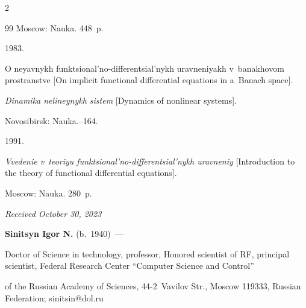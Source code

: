 \begin{multicols}{2}
{{\begin{thebibliography}{99}
Moscow: Nauka. 448~p.





 1983.

O neyavnykh funktsional'no-differentsial'nykh uravneniyakh v~banakhovom pro\-stran\-st\-ve [On implicit functional differential equations in a~Banach space].

\textit{Dinamika nelineynykh sistem} [Dynamics of nonlinear systems]. 

Novosibirsk: Nauka.--164.





 1991.

\textit{Vvedenie v~teoriyu funktsional'no-differentsial'nykh uravneniy} [Introduction to the theory of functional differential equations]. 

Moscow: Nauka. 280~p.

 





\end{thebibliography}



 }

 }



\end{multicols}



\vspace*{-6pt}



\hfill{\small\textit{Received October 30, 2023}} 



\vspace*{-18pt}



\Contrl



\vspace*{-3pt}



\noindent 

\textbf{Sinitsyn Igor N.} (b.\ 1940)~--- 

Doctor of Science in technology, professor, Honored scientist of RF, principal scientist, Federal Research Center ``Computer Science and Control''

 of the Russian Academy of Sciences, 44-2~Vavilov Str., Moscow 119333, Russian Federation; \mbox{sinitsin@dol.ru}





\label{end\stat}



\renewcommand{\bibname}{\protect\rm Литература} 

